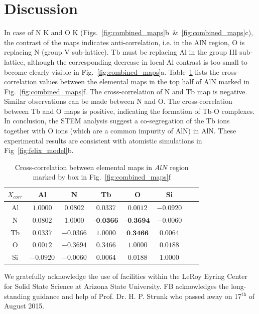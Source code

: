 \documentclass[%
aip,
rsi,%
 amsmath,amssymb,%
 reprint,%
]{revtex4-1}
\begin{document}
\section{Discussion} %
\label{sec:discussion}
In case of N K and O K (Figs.~\ref{fig:combined_maps}b~\&~\ref{fig:combined_maps}c), the contrast of the maps indicates anti-correlation, i.e. in the AlN region, O is replacing N (group V sub-lattice). Tb must be replacing Al in the group III sub-lattice, although the corresponding decrease in local Al contrast is too small to become clearly visible in Fig.~\ref{fig:combined_maps}a. Table~\ref{tab:xcorr} lists the cross-correlation values between the elemental maps in the top half of AlN marked in Fig.~\ref{fig:combined_maps}f. The cross-correlation of N and Tb map is negative. Similar observations can be made between N and O. The cross-correlation between Tb and O maps is positive, indicating the formation of Tb-O complexes. In conclusion, the STEM analysis suggest a co-segregation of the Tb ions together with O ions (which are a common impurity of AlN) in AlN. These experimental results are consistent with atomistic simulations in Fig~\ref{fig:felix_model}b.
\begin{table}[h]
	\caption{Cross-correlation between elemental maps in $AlN$ region marked by box in Fig.~\ref{fig:combined_maps}f}
    \label{tab:xcorr}
    \begin{ruledtabular}
    	\begin{tabular}{cccccccc}
        	$X_{corr}$&Al&N&Tb&O&Si													\\ \hline
            Al& $1.0000$& $0.0802$& $0.0337$& $0.0012$&$-0.0920$					\\
             N& $0.0802$& $1.0000$& $\textbf{-0.0366}$&$\textbf{-0.3694}$&$-0.0060$	\\
            Tb& $0.0337$&$-0.0366$& $1.0000$& $\textbf{0.3466}$&$0.0064$			\\
             O& $0.0012$&$-0.3694$&	$0.3466$& $1.0000$&$0.0188$						\\
            Si&$-0.0920$&$-0.0060$&$0.0064$&$0.0188$& $1.0000$
    	\end{tabular}
    \end{ruledtabular}
\end{table}
\begin{acknowledgments}
We gratefully acknowledge the use of facilities within the LeRoy Eyring Center for Solid State Science at Arizona State University. FB acknowledges the long-standing guidance and help of Prof. Dr. H. P. Strunk who passed away on 17$^\text{th}$ of August 2015.
\end{acknowledgments}

\end{document}
